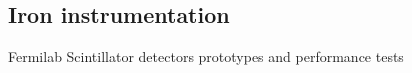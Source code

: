 \subsection{Iron instrumentation}

Fermilab Scintillator detectors prototypes and performance tests

\vspace{2cm}